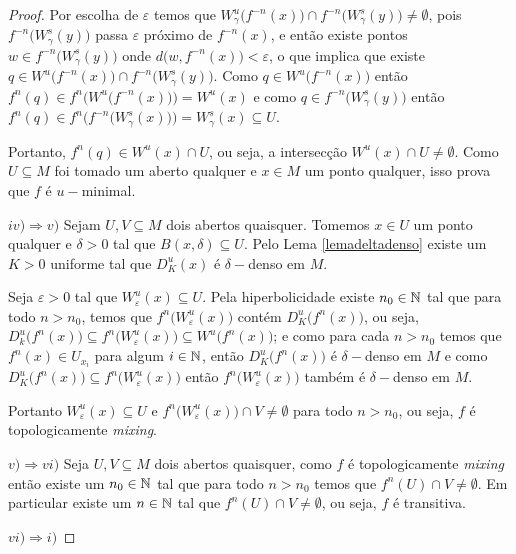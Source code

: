 \begin{proof}
Por escolha de $\varepsilon$ temos que $W^{u}_{\gamma}\big(f^{-n}(x)\big)\cap f^{-n}\big(W^{s}_{\gamma}(y)\big)\neq \emptyset$, pois $f^{-n}\big(W^{s}_{\gamma}(y)\big)$ passa $\varepsilon$ próximo de $f^{-n}(x)$, e então existe pontos $w\in f^{-n}\big(W^{s}_{\gamma}(y)\big)$ onde $d\big(w,f^{-n}(x)\big)<\varepsilon$, o que implica que existe $q\in W^{u}\big(f^{-n}(x)\big)\cap f^{-n}\big(W^{s}_{\gamma}(y)\big)$. Como $q\in W^{u}\big(f^{-n}(x)\big)$ então $f^n(q)\in f^n\Big(W^{u}\big(f^{-n}(x)\big)\Big)=W^{u}(x)$ e como $q\in f^{-n}\big(W^{s}_{\gamma}(y)\big)$ então $f^n(q)\in f^{n}\Big(f^{-n}\big(W^{s}_{\gamma}(x)\big)\Big)=W^{s}_{\gamma}(x)\subseteq U$.

Portanto, $f^n(q)\in W^{u}(x)\cap U$, ou seja, a intersecção $W^{u}(x)\cap U\neq\emptyset$. Como $U\subseteq M$ foi tomado um aberto qualquer e $x\in M$ um ponto qualquer, isso prova que $f$ é $u-$minimal.

$iv)\Rightarrow v)$ Sejam $U,V\subseteq M$ dois abertos quaisquer. Tomemos $x\in U$ um ponto qualquer e $\delta>0$ tal que $B(x,\delta)\subseteq U$. Pelo Lema \ref{lemadeltadenso} existe um $K>0$ uniforme tal que $D_{K}^{u}(x)$ é $\delta-$denso em $M$.

Seja $\varepsilon>0$ tal que $W^{u}_{\varepsilon}(x)\subseteq U$. Pela hiperbolicidade existe $n_0\in\mathbb{N}$ tal que para todo $n>n_0$, temos que $f^n\big(W^{u}_{\varepsilon}(x)\big)$ contém $D_{K}^{u}\big(f^n(x)\big)$, ou seja, $D_{k}^{u}\big(f^n(x)\big)\subseteq f^n\big(W^{u}_{\varepsilon}(x)\big)\subseteq W^{u}\big(f^n(x)\big)$; e como para cada $n>n_0$ temos que $f^n(x)\in U_{x_i}$ para algum $i\in\mathbb{N}$, então $D^{u}_{K}\big(f^n(x)\big)$ é $\delta-$denso em $M$ e como $D^{u}_{K}\big(f^n(x)\big)\subseteq f^n\big(W^{u}_{\varepsilon}(x)\big)$ então $f^n\big(W^{u}_{\varepsilon}(x)\big)$ também é $\delta-$denso em $M$. 

Portanto $W^{u}_{\varepsilon}(x)\subseteq U$ e $f^n\big(W^{u}_{\varepsilon}(x)\big)\cap V\neq\emptyset$ para todo $n>n_0$, ou seja, $f$ é topologicamente \textit{mixing}.

$v)\Rightarrow vi)$ Seja $U,V\subseteq M$ dois abertos quaisquer, como $f$ é topologicamente \textit{mixing} então existe um $n_0\in\mathbb{N}$ tal que para todo $n>n_0$ temos que $f^n(U)\cap V\neq\emptyset$. Em particular existe um $n\in\mathbb{N}$ tal que $f^n(U)\cap V\neq\emptyset$, ou seja, $f$ é transitiva.

$vi)\Rightarrow i)$
\end{proof}



